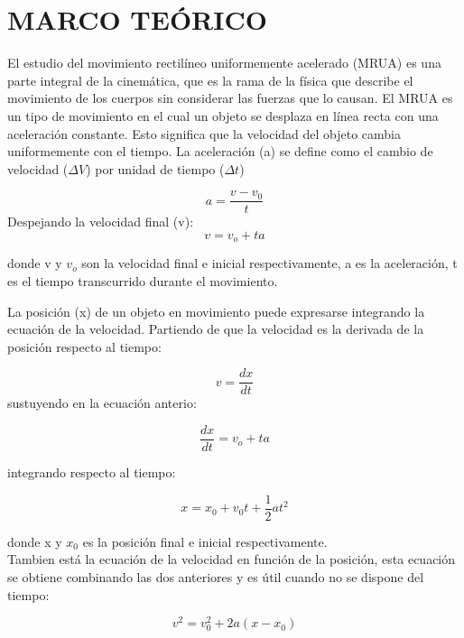 \documentclass[journal]{IEEEtran}
\begin{document}
\section{MARCO TEÓRICO}
El estudio del movimiento rectilíneo uniformemente acelerado (MRUA) es una parte integral de la cinemática, que es la rama de la física que describe el movimiento de los cuerpos sin considerar las fuerzas que lo causan. 
El MRUA es un tipo de movimiento en el cual un objeto se desplaza en línea recta con una aceleración constante. Esto significa que la velocidad del objeto cambia uniformemente con el tiempo.
La aceleración (a) se define como el cambio de velocidad (\(\Delta V\)) por unidad de tiempo (\(\Delta t\))

\begin{equation}\label{eq:1}
 a = \frac{v-v_0}{t}
\end{equation}
Despejando la velocidad final (v):
\begin{equation}\label{eq:2}
 v=v_o + ta
\end{equation}

donde v y \(v_o\) son la velocidad final e inicial respectivamente, a es la aceleración, t es el tiempo transcurrido durante el movimiento.

La posición (x) de un objeto en movimiento puede expresarse integrando la ecuación de la velocidad. Partiendo de que la velocidad es la derivada de la posición respecto al tiempo:

\begin{equation}\label{eq:2}
 v = \frac{dx}{dt}
\end{equation}
sustuyendo en la ecuación anterio:

\begin{equation}\label{eq:2}
\frac{dx}{dt} = v_o + ta
\end{equation}

integrando respecto al tiempo: 

\begin{equation}\label{eq:2}
x = x_0 + v_0t + \frac{1}{2}at^2
\end{equation}

donde x y \(x_0\) es la posición final e inicial respectivamente.\\

Tambien está la ecuación de la velocidad en función de la posición, esta ecuación se obtiene combinando las dos anteriores y es útil cuando no se dispone del tiempo:

\begin{equation}\label{eq:2}
v^2 = v_0^2 + 2a(x-x_0)
\end{equation}
\end{document}
